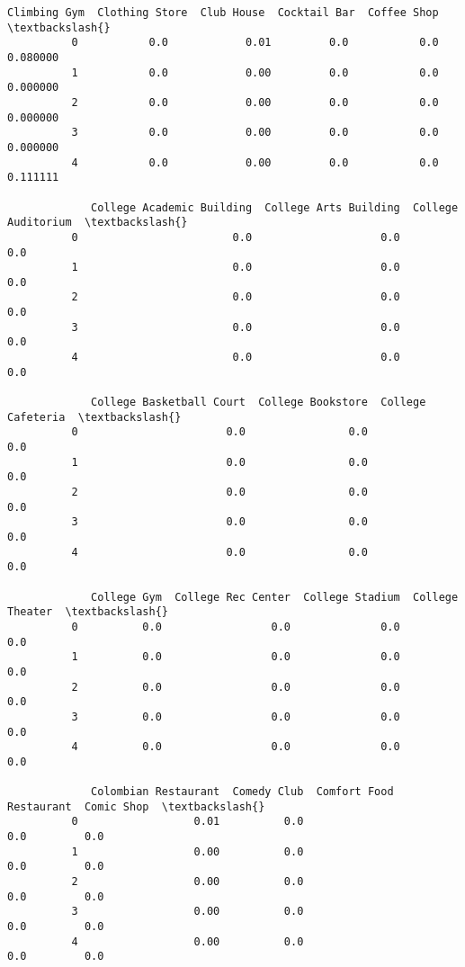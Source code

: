 \documentclass[11pt]{article}
\begin{document}
\begin{Verbatim}[commandchars=\\\{\}]
             Climbing Gym  Clothing Store  Club House  Cocktail Bar  Coffee Shop  \textbackslash{}
          0           0.0            0.01         0.0           0.0     0.080000   
          1           0.0            0.00         0.0           0.0     0.000000   
          2           0.0            0.00         0.0           0.0     0.000000   
          3           0.0            0.00         0.0           0.0     0.000000   
          4           0.0            0.00         0.0           0.0     0.111111   
          
             College Academic Building  College Arts Building  College Auditorium  \textbackslash{}
          0                        0.0                    0.0                 0.0   
          1                        0.0                    0.0                 0.0   
          2                        0.0                    0.0                 0.0   
          3                        0.0                    0.0                 0.0   
          4                        0.0                    0.0                 0.0   
          
             College Basketball Court  College Bookstore  College Cafeteria  \textbackslash{}
          0                       0.0                0.0                0.0   
          1                       0.0                0.0                0.0   
          2                       0.0                0.0                0.0   
          3                       0.0                0.0                0.0   
          4                       0.0                0.0                0.0   
          
             College Gym  College Rec Center  College Stadium  College Theater  \textbackslash{}
          0          0.0                 0.0              0.0              0.0   
          1          0.0                 0.0              0.0              0.0   
          2          0.0                 0.0              0.0              0.0   
          3          0.0                 0.0              0.0              0.0   
          4          0.0                 0.0              0.0              0.0   
          
             Colombian Restaurant  Comedy Club  Comfort Food Restaurant  Comic Shop  \textbackslash{}
          0                  0.01          0.0                      0.0         0.0   
          1                  0.00          0.0                      0.0         0.0   
          2                  0.00          0.0                      0.0         0.0   
          3                  0.00          0.0                      0.0         0.0   
          4                  0.00          0.0                      0.0         0.0   
          

\end{Verbatim}
\end{document}
